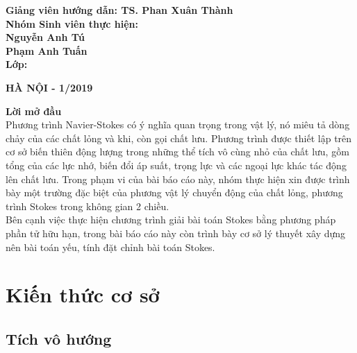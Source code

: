 \documentclass[14pt]{extreport}
\begin{document}
{\begin{center}
\end{center}
\begin{flushleft}
\vspace{1.3cm}
\hspace{1.5cm} \textbf{ Giảng viên hướng dẫn:{ TS. Phan Xuân Thành }}\\[0.2cm]
\hspace{1.5cm} \textbf{ Nhóm Sinh viên thực hiện:}\\[0.2cm]
\hspace{5cm}\textbf{Nguyễn Anh Tú}\\[0.2cm]
\hspace{5cm}\textbf{Phạm Anh Tuấn}\\[0.2cm]
\hspace{1.5cm} \textbf{ Lớp:\hspace{2cm}{ KSTN Toán Tin K60}}\\
\end{flushleft}

\begin{center}
\textbf{{\small HÀ NỘI - 1/2019}}\\
\end{center}
 }
\thispagestyle{empty}
\newpage

\tableofcontents
\newpage


\newpage
{\huge \textbf{Lời mở đầu}} \\

Phương trình Navier-Stokes có ý nghĩa quan trọng trong vật lý, nó miêu tả dòng chảy của các chất lỏng và khi, còn gọi chất lưu. Phương trình được thiết lập trên cơ sở biến thiên động lượng trong những thể tích vô cùng nhỏ của chất lưu, gồm tổng của các lực nhớ, biến đổi áp suất, trọng lực và các ngoại lực khác tác động lên chất lưu. Trong phạm vi của bài báo cáo này, nhóm thực hiện xin được trình bày một trường đặc biệt của phương vật lý chuyển động của chất lỏng, phương trình Stokes trong không gian 2 chiều. \\

Bên cạnh việc thực hiện chương trình giải bài toán Stokes bằng phương pháp phần tử hữu hạn, trong bài báo cáo này còn trình bày cơ sở lý thuyết xây dựng nên bài toán yếu, tính đặt chỉnh bài toán Stokes. \\


\newpage
\chapter{Kiến thức cơ sở}
\section{Tích vô hướng}
\end{document}
